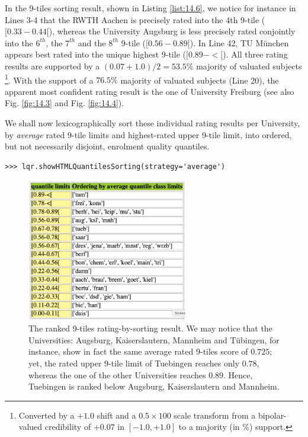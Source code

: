 In the 9-tiles sorting result, shown in Listing \ref{list:14.6}, we notice for instance in Lines 3-4 that the RWTH Aachen is precisely rated into the 4th 9-tile ($[0.33 - 0.44[$), whereas the University Augsburg is less precisely rated conjointly into the $6^{th}$, the $7^{th}$ and the $8^{th}$ 9-tile ($[0.56 - 0.89[$). In Line 42, TU München appears best rated into the unique highest 9-tile ($[0.89 - <[$). All three rating results are supported by a $(0.07 + 1.0)/2 = 53.5\%$ majority of valuated subjects \footnote{Converted by a $+1.0$ shift and a $0.5 \times 100$ scale transform from a bipolar-valued credibility of $+0.07$ in $[-1.0, +1.0]$ to a majority (in \%) support.}. With the support of a $76.5\%$ majority of valuated subjects (Line 20), the apparent most confident rating result is the one of University Freiburg (see also Fig. \ref{fig:14.3} and Fig. \ref{fig:14.4}). 

We shall now lexicographically sort these individual rating results per University, by \emph{average} rated 9-tile limits and highest-rated upper 9-tile limit, into ordered, but not necessarily disjoint, enrolment quality quantiles.

\begin{lstlisting}
>>> lqr.showHTMLQuantilesSorting(strategy='average')
\end{lstlisting}

\begin{figure}[h]
\sidecaption
\includegraphics[width=7cm]{Figures/nineTilingOrdering.png}
\caption{The ranked 9-tiles rating-by-sorting result. We may notice that the Universities: Augsburg, Kaiserslautern, Mannheim and Tübingen, for instance, show in fact the same average rated 9-tiles score of $0.725$; yet, the rated upper 9-tile limit of Tuebingen reaches only $0.78$, whereas the one of the other Universities reaches $0.89$. Hence, Tuebingen is ranked below Augsburg, Kaiserslautern and Mannheim.}
\label{fig:14.6}       %
\end{figure}

